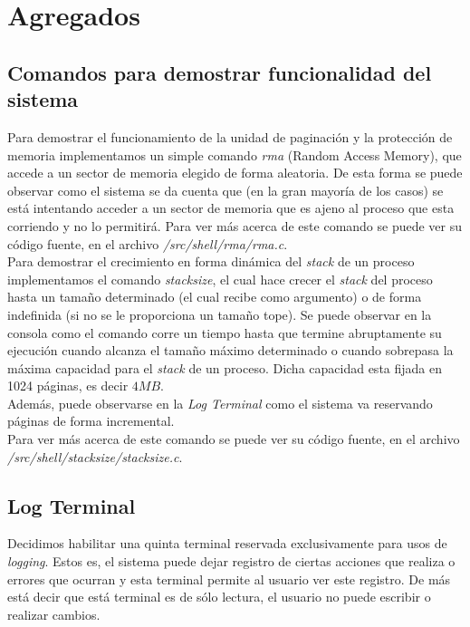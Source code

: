 \documentclass[a4paper,10pt]{article}
\begin{document}
\newpage
\section{Agregados}

        \subsection{Comandos para demostrar funcionalidad del sistema}
             
        Para demostrar el funcionamiento de la unidad de paginación y la protección de memoria implementamos un simple comando \textit{rma} (Random Access Memory), 
        que accede a un sector de memoria elegido de forma aleatoria. De esta forma se puede observar como el sistema se da cuenta que (en la gran mayoría de 
        los casos) se está intentando acceder a un sector de memoria que es ajeno al proceso que esta corriendo y no lo permitirá. Para ver más acerca de este 
        comando se puede ver su código fuente, en el archivo \textit{/src/shell/rma/rma.c}.\\

        Para demostrar el crecimiento en forma dinámica del \textit{stack} de un proceso implementamos el comando \textit{stacksize}, el cual hace crecer el 
        \textit{stack} del proceso hasta un tamaño determinado (el cual recibe como argumento) o de forma indefinida (si no se le proporciona un tamaño tope).
        Se puede observar en la consola como el comando corre un tiempo hasta que termine abruptamente su ejecución cuando alcanza el tamaño máximo determinado 
        o cuando sobrepasa la máxima capacidad para el \textit{stack} de un proceso. Dicha capacidad esta fijada en 1024 páginas, es decir $4 MB$.\\

        Además, puede observarse en la \textit{Log Terminal} como el sistema va reservando páginas de forma incremental.\\

        Para ver más acerca de este comando se puede ver su código fuente, en el archivo \textit{/src/shell/stacksize/stacksize.c}.\\


        \subsection{Log Terminal}

        Decidimos habilitar una quinta terminal reservada exclusivamente para usos de \textit{logging}. 
        Estos es, el sistema puede dejar registro de ciertas acciones que realiza o errores que ocurran y esta terminal permite al usuario ver este registro. De más
        está decir que está terminal es de sólo lectura, el usuario no puede escribir o realizar cambios.\\
\end{document}
